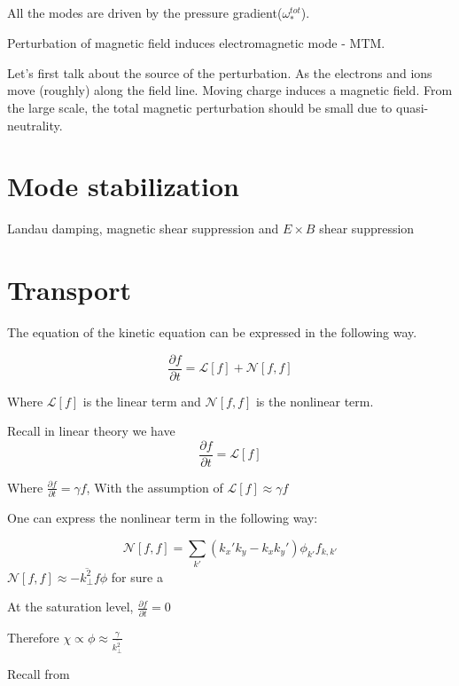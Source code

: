 All the modes are driven by the pressure gradient($\omega_{*}^{tot}$).


Perturbation of magnetic field induces electromagnetic mode - MTM. 

Let's first talk about the source of the perturbation. As the electrons and ions move (roughly) along the field line. Moving charge induces a magnetic field. From the large scale, the total magnetic perturbation should be small due to quasi-neutrality. 

\section{Mode stabilization}

Landau damping, magnetic shear suppression and $E\times B$ shear suppression 

\section{Transport}

The equation of the kinetic equation can be expressed in the following way. 

\begin{equation}
    \frac{\partial f}{\partial t} = \mathcal{L}[f]+\mathcal{N}[f,f]
\end{equation}

Where $\mathcal{L}[f]$ is the linear term and $\mathcal{N}[f,f]$ is the nonlinear term. 

Recall in linear theory we have 
\begin{equation}
    \frac{\partial f}{\partial t} = \mathcal{L}[f]
\end{equation}

Where $ \frac{\partial f}{\partial t} =\gamma f$, 
With the assumption of $\mathcal{L}[f] \approx \gamma f$ 

One can express the nonlinear term in the following way: 

\begin{equation}
    \mathcal{N}[f,f] = \sum_{k'} \left(k_x'k_y-k_xk_y'\right)\phi_{k'} f_{k,k'}
\end{equation}
$\mathcal{N}[f,f] \approx -\overline{k^2_\perp} f \phi$ for sure a 

At the saturation level, $\frac{\partial f}{\partial t} = 0$

Therefore $\chi \propto \phi \approx \frac{\gamma}{\overline{k^2_\perp}}$

Recall from

